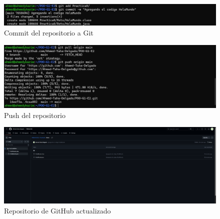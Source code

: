 \documentclass[letterpaper,12pt]{article}
\begin{document}
\begin{figure}[H]
    \centering
    \includegraphics[width=14cm]{Imagenes/commit.jpeg}
    \caption{Commit del repositorio a Git}
    \label{fig:java}
\end{figure}

\begin{figure}[H]
    \centering
    \includegraphics[width=14cm]{Imagenes/push.jpeg}
    \caption{Push del repositorio}
    \label{fig:java}
\end{figure}

\begin{figure}[H]
    \centering
    \includegraphics[width=14cm]{Imagenes/repo.png}
    \caption{Repositorio de GitHub actualizado}
    \label{fig:java}
\end{figure}
\end{document}
